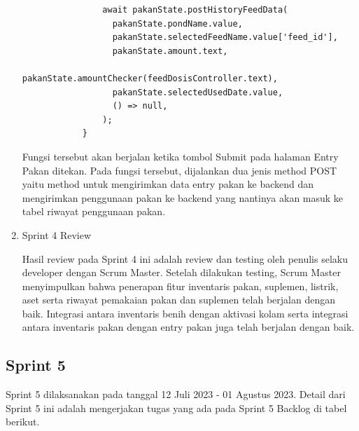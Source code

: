 \begin{spacing}{1.5}
\begin{enumerate}
\begin{lstlisting}
				await pakanState.postHistoryFeedData(
				  pakanState.pondName.value,
				  pakanState.selectedFeedName.value['feed_id'],
				  pakanState.amount.text,
				  pakanState.amountChecker(feedDosisController.text),
				  pakanState.selectedUsedDate.value,
				  () => null,
				);
			}
		\end{lstlisting}

		Fungsi tersebut akan berjalan ketika tombol Submit pada halaman Entry Pakan ditekan. Pada fungsi tersebut, dijalankan dua jenis method POST yaitu method untuk mengirimkan data entry pakan ke backend dan mengirimkan penggunaan pakan ke backend yang nantinya akan masuk ke tabel riwayat penggunaan pakan.

		\item Sprint 4 Review
		
		Hasil review pada Sprint 4 ini adalah review dan testing oleh penulis selaku developer dengan Scrum Master. Setelah dilakukan testing, Scrum Master menyimpulkan bahwa penerapan fitur inventaris pakan, suplemen, listrik, aset serta riwayat pemakaian pakan dan suplemen telah berjalan dengan baik. Integrasi antara inventaris benih dengan aktivasi kolam serta integrasi antara inventaris pakan dengan entry pakan juga telah berjalan dengan baik.
 
	\end{enumerate}

\subsection{Sprint 5}

	Sprint 5 dilaksanakan pada tanggal 12 Juli 2023 - 01 Agustus 2023. Detail dari Sprint 5 ini adalah mengerjakan tugas yang ada pada Sprint 5 Backlog di tabel berikut.
		

\end{spacing}
